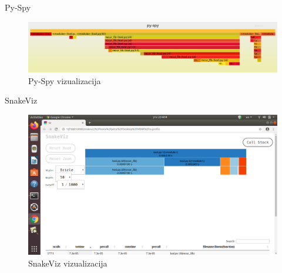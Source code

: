 \documentclass{beamer}
\begin{document}
\begin{frame}{Py-Spy}
\begin{figure}[h!]
\begin{center}
\includegraphics[scale=0.25]{ps.png}
\end{center}
\caption{Py-Spy vizualizacija}
\label{fig:ps_viz}
\end{figure}
\end{frame}

\begin{frame}{SnakeViz}
\begin{figure}[h!]
\begin{center}
\includegraphics[trim={10cm 15cm 5cm 6.5cm},clip,scale=0.32]{snakeviz1.png}
\end{center}
\caption{SnakeViz vizualizacija}
\label{fig:snake_viz_1}
\end{figure}


\end{frame}
\end{document}
